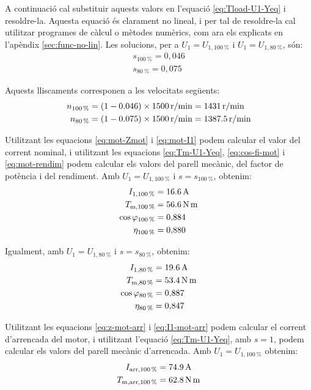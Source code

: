 \begin{exemple}
	A continuació cal substituir aquests valors en l'equació \eqref{eq:Tload-U1-Yeq} i resoldre-la. Aquesta equació és clarament no lineal, i per tal de resoldre-la cal utilitzar programes de càlcul o mètodes numèrics, com ara els explicats en l'apèndix \ref{sec:func-no-lin}. Les solucions, per a $U_1=U_{1,\qty{100}{\%}}$ i $U_1=U_{1,\qty{80}{\%}}$, són:
	\begin{align*}
		s_{\qty{100}{\%}} = 0{,}046 \\
	 	s_{\qty{80}{\%}}= 0{,}075
	\end{align*}	
	
	Aquests lliscaments corresponen a les velocitats següents:
	\begin{align*}
		n_\mathrm{\qty{100}{\%}} &= (1-\num{0,046})\times \qty{1500}{r/min} = \qty{1431}{r/min} \\
		n_\mathrm{\qty{80}{\%}} &= (1-\num{0,075})\times \qty{1500}{r/min} = \qty{1387,5}{r/min}
	\end{align*}
	
	Utilitzant les equacions \eqref{eq:mot-Zmot} i \eqref{eq:mot-I1} podem calcular el valor del corrent nominal, i utilitzant les equacions \eqref{eq:Tm-U1-Yeq}, \eqref{eq:cos-fi-mot} i \eqref{eq:mot-rendim} podem calcular els valors del parell mecànic, del factor de potència i del rendiment. Amb $U_1 = U_{1,\qty{100}{\%}}$  i $s = s_{\qty{100}{\%}}$, obtenim:
	\begin{align*}
		I_{1,\qty{100}{\%}} &= \qty{16,6}{A} \\
		T_\mathrm{m,\qty{100}{\%}} &=  \qty{56,6}{N.m} \\
		\cos\varphi_{\qty{100}{\%}} &=  0{,}884 \\
		\eta_{\qty{100}{\%}} &=  0{,}880
	\end{align*}
	
	Igualment, amb $U_1 = U_{1,\qty{80}{\%}}$ i $s = s_{\qty{80}{\%}}$, obtenim:
	\pagebreak
	\begin{align*}
		I_{1,\qty{80}{\%}} &= \qty{19,6}{A} \\
		T_\mathrm{m,\qty{80}{\%}} &=  \qty{53,4}{N.m} \\
		\cos\varphi_{\qty{80}{\%}} &=  0{,}887 \\
		\eta_{\qty{80}{\%}} &=  0{,}847
	\end{align*}

	Utilitzant les equacions \eqref{eq:z-mot-arr} i \eqref{eq:I1-mot-arr} podem calcular el corrent d'arrencada del motor, i utilitzant l'equació \eqref{eq:Tm-U1-Yeq}, amb $s=1$, podem calcular els valors del parell mecànic d'arrencada. Amb $U_1 = U_{1,\qty{100}{\%}}$   obtenim:
	\vspace{-2mm}
	\begin{align*}
		I_\mathrm{arr,\qty{100}{\%}} &=  \qty{74,9}{A} \\
		T_\mathrm{m,arr,\qty{100}{\%}} &=  \qty{62,8}{N.m} 
	\end{align*}
	

\end{exemple}
